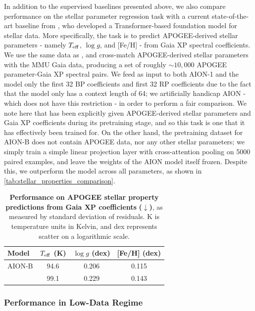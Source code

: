 \documentclass[]{polymathic}
\begin{document}
In addition to the supervised baselines presented above, we also compare performance on the stellar parameter regression task with a current state-of-the-art baseline from \cite{Leung2024}, who developed a Transformer-based foundation model for stellar data. More specifically, the task is to predict APOGEE-derived stellar parameters - namely $T_{\rm eff}$, $\log g$, and [Fe/H] - from Gaia XP spectral coefficients. We use the same data as \cite{Leung2024}, and cross-match APOGEE-derived stellar parameters with the MMU Gaia data, producing a set of roughly $\sim 10,000$ APOGEE parameter-Gaia XP spectral pairs. We feed as input to both AION-1 and the \cite{Leung2024} model only the first 32 BP coefficients and first 32 RP coefficients due to the fact that the \cite{Leung2024} model only has a context length of 64; we artificially handicap AION - which does not have this restriction - in order to perform a fair comparison. We note here that \cite{Leung2024} has been explicitly given APOGEE-derived stellar parameters and Gaia XP coefficients during its pretraining stage, and so this task is one that it has effectively been trained for. On the other hand, the pretraining dataset for AION-B does not contain APOGEE data, nor any other stellar parameters; we simply train a simple linear projection layer with cross-attention pooling on 5000 paired examples, and leave the weights of the AION model itself frozen. Despite this, we outperform the \cite{Leung2024} model across all parameters, as shown in \autoref{tab:stellar_properties_comparison}.

\begin{table}[h]
  \centering
  \small
  \begin{tabular}{lccc}
    \toprule
    \textbf{Model} & $T_{\rm eff}$ (K) & $\log g$ (dex) & [Fe/H] (dex) \\
    \midrule
    AION-B            & 94.6 & 0.206 & 0.115 \\
    \cite{Leung2024}  & 99.1 & 0.229 & 0.143 \\
    \bottomrule
  \end{tabular}
  \caption{\textbf{Performance on APOGEE stellar property predictions from Gaia XP coefficients} \textbf{($\downarrow$)}, as measured by standard deviation of residuals. K is temperature units in Kelvin, and dex represents scatter on a logarithmic scale.}
  \label{tab:stellar_properties_comparison}
\end{table}



\subsubsection{Performance in Low-Data Regime}
\end{document}
